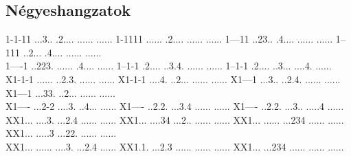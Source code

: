\documentclass[a4paper,11pt]{article}
\begin{document}
\subsection{Négyeshangzatok}
           {1-1-11%
            ...3..%
            .2....%
            ......%
            ......} 
           {1-1111%
            ......%
            .2....%
            ......%
            ......} 
           {1---11%
            ..23..%
            .4....%
            ......%
            ......} 
           {1--111%
            ..2...%
            .4....%
            ......%
            ......}\\
           {1----1%
            ..223.%
            ......%
            .4....%
            ......} 
           {1--1-1%
            .2....%
            ..3.4.%
            ......%
            ......} 
           {1--1-1%
            .2....%
            ..3...%
            ....4.%
            ......}\\
           {X1-1-1%
            ......%
            ..2.3.%
            ......%
            ......} 
           {X1-1-1%
            ....4.%
            ..2...%
            ......%
            ......} 
           {X1---1%
            ...3..%
            ..2.4.%
            ......%
            ......} 
           {X1---1%
            ...33.%
            ..2...%
            ......%
            ......}\\
           {X1----%
            ...2-2%
            ....3.%
            ..4...%
            ......} 
           {X1----%
            ..2.2.%
            ...3.4%
            ......%
            ......} 
           {X1----%
            ..2.2.%
            ...3..%
            .....4%
            ......}\\
           {XX1...%
            ....3.%
            ...2.4%
            ......%
            ......} 
           {XX1...%
            ....34%
            ...2..%
            ......%
            ......} 
           {XX1...%
            ......%
            ...234%
            ......%
            ......} 
           {XX1...%
            .....3%
            ...22.%
            ......%
            ......}\\
           {XX1...%
            ......%
            ....3.%
            ...2.4%
            ......} 
           {XX1.1.%
            ...2.3%
            ......%
            ......%
            ......} 
           {XX1...%
            ...234%
            ......%
            ......%
            ......}
\end{document}
